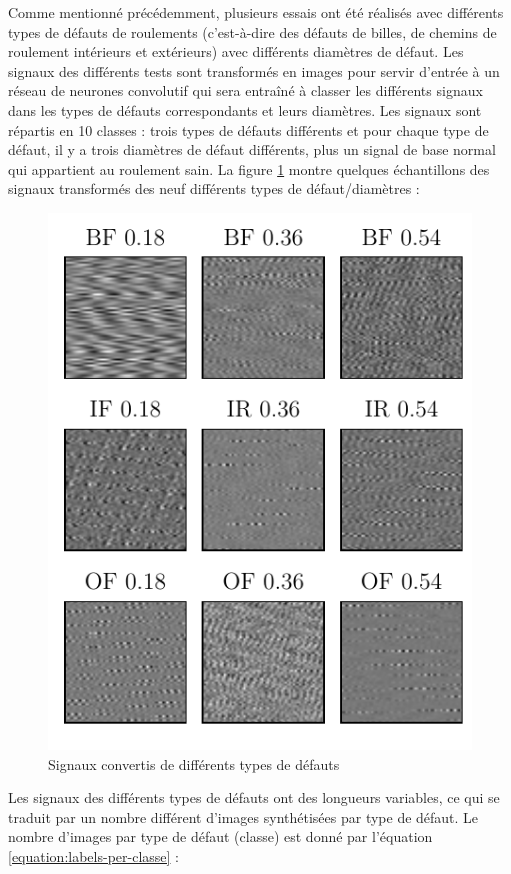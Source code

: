 Comme mentionné précédemment, plusieurs essais ont été réalisés avec différents types de défauts de roulements (c'est-à-dire des défauts de billes, de chemins de roulement intérieurs et extérieurs) avec différents diamètres de défaut. Les signaux des différents tests sont transformés en images pour servir d'entrée à un réseau de neurones convolutif qui sera entraîné à classer les différents signaux dans les types de défauts correspondants et leurs diamètres. Les signaux sont répartis en 10 classes : trois types de défauts différents et pour chaque type de défaut, il y a trois diamètres de défaut différents, plus un signal de base normal qui appartient au roulement sain. La figure \ref{fig:bearings_faults_samples} montre quelques échantillons des signaux transformés des neuf différents types de défaut/diamètres : 

\begin{figure}[h]
    \centering
	\includegraphics{figures/cw_bearings_faults_samples.pdf}
    \caption{Signaux convertis de différents types de défauts}
    \label{fig:bearings_faults_samples}
\end{figure}

Les signaux des différents types de défauts ont des longueurs variables, ce qui se traduit par un nombre différent d'images synthétisées par type de défaut. Le nombre d'images par type de défaut (classe) est donné par l'équation \ref{equation:labels-per-classe} :

